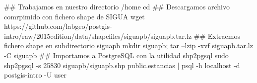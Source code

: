 \lstset{caption=Importación de estancias}
\begin{bash}
## Trabajamos en nuestro directorio /home
cd
## Descargamos archivo comrpimido con fichero shape de SIGUA
wget https://github.com/labgeo/postgis-intro/raw/2015edition/data/shapefiles/siguapb/siguapb.tar.lz
## Extraemos fichero shape en subdirectorio siguapb
mkdir siguapb; tar --lzip -xvf siguapb.tar.lz -C siguapb
## Importamos a PostgreSQL con la utilidad shp2pgsql
sudo shp2pgsql -s 25830 siguapb/siguapb.shp public.estancias  | psql -h localhost -d postgis-intro -U user
\end{bash}
